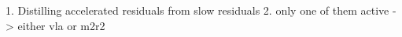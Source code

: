 1. Distilling accelerated residuals from slow residuals
2. only one of them active -> either vla or m2r2